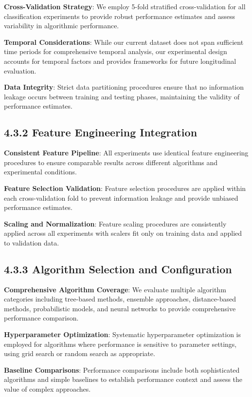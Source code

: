 \documentclass[
  12pt,
  a4paper,
]{report}
\begin{document}
\textbf{Cross-Validation Strategy}: We employ 5-fold stratified
cross-validation for all classification experiments to provide robust
performance estimates and assess variability in algorithmic performance.

\textbf{Temporal Considerations}: While our current dataset does not
span sufficient time periods for comprehensive temporal analysis, our
experimental design accounts for temporal factors and provides
frameworks for future longitudinal evaluation.

\textbf{Data Integrity}: Strict data partitioning procedures ensure that
no information leakage occurs between training and testing phases,
maintaining the validity of performance estimates.

\subsection{4.3.2 Feature Engineering
Integration}\label{feature-engineering-integration}

\textbf{Consistent Feature Pipeline}: All experiments use identical
feature engineering procedures to ensure comparable results across
different algorithms and experimental conditions.

\textbf{Feature Selection Validation}: Feature selection procedures are
applied within each cross-validation fold to prevent information leakage
and provide unbiased performance estimates.

\textbf{Scaling and Normalization}: Feature scaling procedures are
consistently applied across all experiments with scalers fit only on
training data and applied to validation data.

\subsection{4.3.3 Algorithm Selection and
Configuration}\label{algorithm-selection-and-configuration}

\textbf{Comprehensive Algorithm Coverage}: We evaluate multiple
algorithm categories including tree-based methods, ensemble approaches,
distance-based methods, probabilistic models, and neural networks to
provide comprehensive performance comparison.

\textbf{Hyperparameter Optimization}: Systematic hyperparameter
optimization is employed for algorithms where performance is sensitive
to parameter settings, using grid search or random search as
appropriate.

\textbf{Baseline Comparisons}: Performance comparisons include both
sophisticated algorithms and simple baselines to establish performance
context and assess the value of complex approaches.
\end{document}
